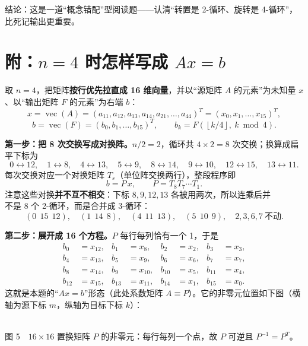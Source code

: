 \documentclass[11pt,a4paper,UTF8]{ctexart}
\begin{document}
\vfill
\begin{center}
{\small\color{gray} 结论：这是一道“概念错配”型阅读题——认清“转置是 2-循环、旋转是 4-循环”，比死记输出更重要。}
\end{center}

\newpage
\section*{附：$n=4$ 时怎样写成 $Ax=b$}

取 $n=4$，把矩阵\textbf{按行优先拉直成 16 维向量}，并以“源矩阵 $A$ 的元素”为未知量 $x$、以“输出矩阵 $F$ 的元素”为右端 $b$：
\[
x=\operatorname{vec}(A)=(a_{11},a_{12},a_{13},a_{14},a_{21},\dots,a_{44})^{T}=(x_0,x_1,\dots,x_{15})^{T},
\]
\[
b=\operatorname{vec}(F)=(b_0,b_1,\dots,b_{15})^{T},\qquad b_k=F\!\left(\left\lfloor k/4\right\rfloor,\ k\bmod 4\right).
\]

\textbf{第一步：把 8 次交换写成对换阵。}$n/2=2$，循环共 $4\times2=8$ 次交换；换算成扁平下标为
\[
0\!\leftrightarrow\!12,\quad 1\!\leftrightarrow\!8,\quad 4\!\leftrightarrow\!13,\quad 5\!\leftrightarrow\!9,\quad
8\!\leftrightarrow\!14,\quad 9\!\leftrightarrow\!10,\quad 12\!\leftrightarrow\!15,\quad 13\!\leftrightarrow\!11 .
\]
每次交换对应一个对换矩阵 $T_s$（单位阵交换两行），整段程序即
\[
b=P\,x,\qquad P=T_{8}T_{7}\cdots T_{1}.
\]
注意这些对换\textbf{并不互不相交}：下标 $8,9,12,13$ 各被用两次，所以连乘后并\\不是 8 个 2-循环，而是合并成 3-循环：
\[
(0\ \ 15\ \ 12),\quad (1\ \ 14\ \ 8),\quad (4\ \ 11\ \ 13),\quad (5\ \ 10\ \ 9),\quad 2,3,6,7\ \text{不动}.
\]

\textbf{第二步：展开成 16 个方程。}$P$ 每行每列恰有一个 1，于是
\[
\begin{aligned}
b_0&=x_{12}, & b_1&=x_{8}, & b_2&=x_{2}, & b_3&=x_{3},\\
b_4&=x_{13}, & b_5&=x_{9}, & b_6&=x_{6}, & b_7&=x_{7},\\
b_8&=x_{14}, & b_9&=x_{10}, & b_{10}&=x_{5}, & b_{11}&=x_{4},\\
b_{12}&=x_{15}, & b_{13}&=x_{11}, & b_{14}&=x_{1}, & b_{15}&=x_{0}.
\end{aligned}
\]
这就是本题的“$Ax=b$”形态（此处系数矩阵 $A\equiv P$）。它的非零元位置如下图（横轴为源下标 $m$，纵轴为目标下标 $k$）：

\begin{center}
\\[2pt]
{\small 图 5\ \ $16\times16$ 置换矩阵 $P$ 的非零元：每行每列一个点，故 $P$ 可逆且 $P^{-1}=P^{T}$。}
\end{center}
\end{document}
